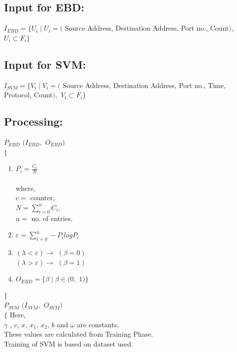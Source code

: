 \documentclass[12pt,a4paper,final]{report}
\DeclareRobustCommand{\gobblefive}[5]{}
\newcommand*{\SkipTocEntry}{\addtocontents{toc}{\gobblefive}}
\begin{document}
\SkipTocEntry\subsection{Input for EBD:}

$I_{EBD} = \lbrace U_{i} \mid U_{i} = ($ Source Address, Destination Address, Port no., Count$),  $ $ U_{i}  \subset F_{i} \rbrace$


\SkipTocEntry\subsection{Input for SVM:}

$I_{SVM} = \lbrace V_{i} \mid V_{i} = ($ Source Address, Destination Address, Port no., Time, Protocol, Count$),  $ $ V_{i}  \subset F_{i} \rbrace$



\SkipTocEntry\subsection{Processing:}
$P_{EBD} $ $ (I_{EBD},$ $O_{EBD})$\\
$\lbrace$

\begin{enumerate}

\item $P_{i} = \frac{C_{i}}{N}$ \\ \\where, \\ $c =$ counter, \\ $N = \sum_{i=0}^{n} C_{i}$, \\ $n =$ no. of entries.

\item $\varepsilon = \sum_{i=0}^{n} - P_{i} log P_{i}$

\item $(\lambda < \varepsilon) \rightarrow  $ $ (\beta = 0)$ \\ $(\lambda > \varepsilon) \rightarrow  $ $ (\beta = 1)$

\item $ O_{EBD} = \lbrace \beta \mid \beta \in (0, $ $1) \rbrace$

\end{enumerate}

$\\ \rbrace$
\\

\newpage
\noindent
$P_{SVM} $ $ (I_{SVM},$ $O_{SVM})$\\
$\lbrace$
\indent
Here, \\
\indent $\gamma$ , $c$, $x$, $x_{1}$, $x_{2}$, $b$ and $\overline{\omega}$ are constants.\\
\indent These values are calculated from Training Phase.\\
\indent Training of SVM is based on dataset used.
\end{document}
